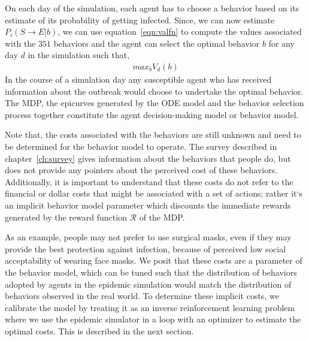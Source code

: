 \documentclass[doublespace]{VTthesis}
\begin{document}
    On each day of the simulation, each agent has to choose a behavior based on its estimate of its probability of getting infected. Since, we can now estimate $P_i(S \rightarrow E|b)$, we can use equation~\ref{eqn:valfn} to compute the values associated with the $351$ behaviors and the agent can select the optimal behavior $b$ for any day $d$ in the simulation such that,
    \begin{align}
        max_{b} V_d(b)
    	\label{eqn:optb}
    \end{align}
    In the course of a simulation day any susceptible agent who has received information about the outbreak would choose to undertake the optimal behavior. The MDP, the epicurves generated by the ODE model and the behavior selection process together constitute the agent decision-making model or behavior model.  
    
    Note that, the costs associated with the behaviors are still unknown and need to be determined for the behavior model to operate. The survey described in chapter~\ref{ch:survey} gives information about the behaviors that people do, but does not provide any pointers about the perceived cost of these behaviors. Additionally, it is important to understand that these costs do not refer to the financial or dollar costs that might be associated with a set of actions; rather it`s an implicit behavior model parameter which discounts the immediate rewards generated by the reward function $\mathcal{R}$ of the MDP.
    
    As an example, people may not prefer to use surgical masks, even if they may provide the best protection against infection, because of perceived low social acceptability of wearing face masks. We posit that these costs are a parameter of the behavior model, which can be tuned such that the distribution of behaviors adopted by agents in the epidemic simulation would match the distribution of behaviors observed in the real world. To determine these implicit costs, we calibrate the model by treating it as an inverse reinforcement learning problem where we use the epidemic simulator in a loop with an optimizer to estimate the optimal costs. This is described in the next section.
    
\end{document}
